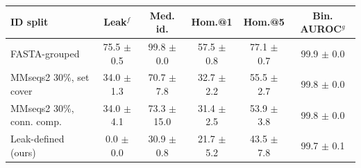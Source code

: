 \begin{tabular}{lccccc}
\toprule
ID split & Leak$^f$ & Med. id. & Hom.@1 & Hom.@5 & Bin. AUROC$^g$ \\
\midrule
FASTA-grouped & 75.5 $\pm$ 0.5 & 99.8 $\pm$ 0.0 & 57.5 $\pm$ 0.8 & 77.1 $\pm$ 0.7 & 99.9 $\pm$ 0.0 \\
MMseqs2 30\%, set cover & 34.0 $\pm$ 1.3 & 70.7 $\pm$ 7.8 & 32.7 $\pm$ 2.2 & 55.5 $\pm$ 2.7 & 99.8 $\pm$ 0.0 \\
MMseqs2 30\%, conn. comp. & 34.0 $\pm$ 4.1 & 73.3 $\pm$ 15.0 & 31.4 $\pm$ 2.5 & 53.9 $\pm$ 3.8 & 99.8 $\pm$ 0.0 \\
Leak-defined (ours) & 0.0 $\pm$ 0.0 & 30.9 $\pm$ 0.8 & 21.7 $\pm$ 5.2 & 43.5 $\pm$ 7.8 & 99.7 $\pm$ 0.1 \\
\bottomrule
\end{tabular}

